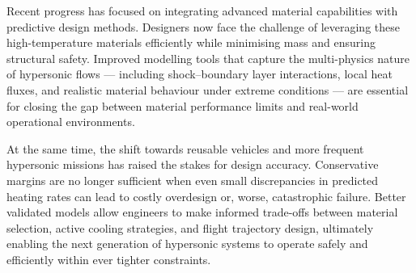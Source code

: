 Recent progress has focused on integrating advanced material capabilities with predictive design methods. Designers now face the challenge of leveraging these high-temperature materials efficiently while minimising mass and ensuring structural safety. Improved modelling tools that capture the multi-physics nature of hypersonic flows — including shock–boundary layer interactions, local heat fluxes, and realistic material behaviour under extreme conditions — are essential for closing the gap between material performance limits and real-world operational environments.

At the same time, the shift towards reusable vehicles and more frequent hypersonic missions has raised the stakes for design accuracy. Conservative margins are no longer sufficient when even small discrepancies in predicted heating rates can lead to costly overdesign or, worse, catastrophic failure. Better validated models allow engineers to make informed trade-offs between material selection, active cooling strategies, and flight trajectory design, ultimately enabling the next generation of hypersonic systems to operate safely and efficiently within ever tighter constraints.





